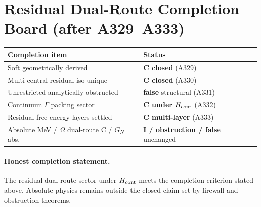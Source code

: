 \section*{Residual Dual-Route Completion Board (after A329--A333)}
\begin{center}
\begin{tabular}{@{}p{5.4cm}p{6.8cm}@{}}
\toprule
Completion item & Status \\
\midrule
Soft geometrically derived & \textbf{C closed} (A329) \\
Multi-central residual-iso unique & \textbf{C closed} (A330) \\
Unrestricted analytically obstructed & \textbf{false} structural (A331) \\
Continuum $\Gamma$ packing sector & \textbf{C under $H_{\rm cont}$} (A332) \\
Residual free-energy layers settled & \textbf{C multi-layer} (A333) \\
Absolute MeV / $\Omega$ dual-route C / $G_N$ abs. & \textbf{I / obstruction / false} unchanged \\
\bottomrule
\end{tabular}
\end{center}

\paragraph{Honest completion statement.}
The residual dual-route sector under $H_{\rm cont}$ meets the completion criterion stated above.
Absolute physics remains outside the closed claim set by firewall and obstruction theorems.
